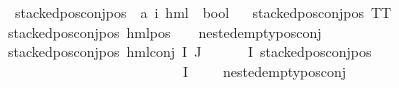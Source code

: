 \begin{isabellebody}
\isanewline
\isanewline
\isanewline
\isanewline
\isanewline
{}\isamarkupfalse%
\ stacked{\isacharunderscore}{\kern0pt}pos{\isacharunderscore}{\kern0pt}conj{\isacharunderscore}{\kern0pt}pos\ {\isacharcolon}{\kern0pt}{\isacharcolon}{\kern0pt}\ {\isachardoublequoteopen}{\isacharparenleft}{\kern0pt}{\isacharprime}{\kern0pt}a{\isacharcomma}{\kern0pt}\ {\isacharprime}{\kern0pt}i{\isacharparenright}{\kern0pt}\ hml\ {\isasymRightarrow}\ bool{\isachardoublequoteclose}\isanewline
\ \ \isanewline
{\isachardoublequoteopen}stacked{\isacharunderscore}{\kern0pt}pos{\isacharunderscore}{\kern0pt}conj{\isacharunderscore}{\kern0pt}pos\ TT{\isachardoublequoteclose}\ {\isacharbar}{\kern0pt}\isanewline
{\isachardoublequoteopen}stacked{\isacharunderscore}{\kern0pt}pos{\isacharunderscore}{\kern0pt}conj{\isacharunderscore}{\kern0pt}pos\ {\isacharparenleft}{\kern0pt}hml{\isacharunderscore}{\kern0pt}pos\ {\isacharunderscore}{\kern0pt}\ {\isasympsi}{\isacharparenright}{\kern0pt}{\isachardoublequoteclose}\ \ {\isachardoublequoteopen}nested{\isacharunderscore}{\kern0pt}empty{\isacharunderscore}{\kern0pt}pos{\isacharunderscore}{\kern0pt}conj\ {\isasympsi}{\isachardoublequoteclose}\ {\isacharbar}{\kern0pt}\isanewline
{\isachardoublequoteopen}stacked{\isacharunderscore}{\kern0pt}pos{\isacharunderscore}{\kern0pt}conj{\isacharunderscore}{\kern0pt}pos\ {\isacharparenleft}{\kern0pt}hml{\isacharunderscore}{\kern0pt}conj\ I\ J\ {\isasymPhi}{\isacharparenright}{\kern0pt}{\isachardoublequoteclose}\isanewline
{}\ {\isachardoublequoteopen}{\isacharparenleft}{\kern0pt}{\isacharparenleft}{\kern0pt}{\isasymexists}{\isasymphi}\ {\isasymin}\ {\isacharparenleft}{\kern0pt}{\isasymPhi}\ {\isacharbackquote}{\kern0pt}\ I{\isacharparenright}{\kern0pt}{\isachardot}{\kern0pt}\ {\isacharparenleft}{\kern0pt}{\isacharparenleft}{\kern0pt}stacked{\isacharunderscore}{\kern0pt}pos{\isacharunderscore}{\kern0pt}conj{\isacharunderscore}{\kern0pt}pos\ {\isasymphi}{\isacharparenright}{\kern0pt}\ {\isasymand}\ \isanewline
\ \ \ \ \ \ \ \ \ \ \ \ \ \ \ \ \ \ \ \ \ {\isacharparenleft}{\kern0pt}{\isasymforall}{\isasympsi}\ {\isasymin}\ {\isacharparenleft}{\kern0pt}{\isasymPhi}\ {\isacharbackquote}{\kern0pt}\ I{\isacharparenright}{\kern0pt}{\isachardot}{\kern0pt}\ {\isasympsi}\ {\isasymnoteq}\ {\isasymphi}\ {\isasymlongrightarrow}\ nested{\isacharunderscore}{\kern0pt}empty{\isacharunderscore}{\kern0pt}pos{\isacharunderscore}{\kern0pt}conj\ {\isasympsi}{\isacharparenright}{\kern0pt}{\isacharparenright}{\kern0pt}{\isacharparenright}{\kern0pt}\ {\isasymor}\isanewline

\end{isabellebody}
